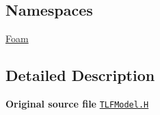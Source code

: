 \subsection*{Namespaces}
\begin{DoxyCompactItemize}
\item 
 \hyperlink{namespaceFoam}{Foam}
\end{DoxyCompactItemize}


\subsection{Detailed Description}
{\bfseries Original source file} \href{../../../home/carlo/data/GeN-Foam/GeN-Foam_ffn/GeN-Foam/GeN-Foam/classes/thermalHydraulics/src/physicsModels/heatTransferModels/FSHeatTransferCoefficientModels/subModels/CHFModels/LeidenFrostTemperatureModels/TLFModel.H}{\tt T\+L\+F\+Model.\+H} 